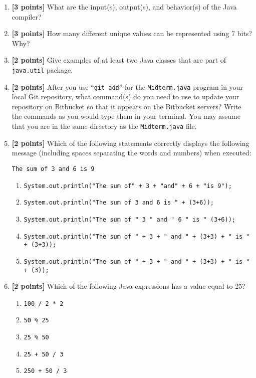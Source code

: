\documentclass[11pt]{report}
\begin{document}
\begin{enumerate}
\item {\bf [3 points]}
What are the input(s), output(s), and behavior(s) of the Java compiler?

\vspace{.75in}
\item {\bf [3 points]}
How many different unique values can be represented using 7 bits? Why?

\bigskip
\bigskip
\bigskip
\bigskip

\item {\bf [2 points]}
Give examples of at least two Java classes that are part of {\tt java.util} package.

\bigskip
\bigskip
\bigskip
\bigskip

\item {\bf [2 points]}
  After you use ``{\tt git add}'' for the {\tt Midterm.java} program in your local Git repository, what command(s) do
  you need to use to update your repository on Bitbucket so that it appears on the Bitbucket servers? Write the commands
  as you would type them in your terminal. You may assume that you are in the same directory as the {\tt Midterm.java}
  file.  

\newpage

\item {\bf [2 points]}
Which of the following statements correctly displays the following
message (including spaces separating the words and numbers) when executed:
\begin{center}
\verb$The sum of 3 and 6 is 9$
\end{center}
\begin{enumerate}
\item \verb$System.out.println("The sum of" + 3 + "and" + 6 + "is 9");$
\item \verb$System.out.println("The sum of 3 and 6 is " + (3+6));$
\item \verb$System.out.println("The sum of " 3 " and " 6 " is " (3+6));$
\item \verb$System.out.println("The sum of " + 3 + " and " + (3+3) + " is " + (3+3));$
\item \verb$System.out.println("The sum of " + 3 + " and " + (3+3) + " is " + (3));$
\end{enumerate}

\bigskip

\item {\bf [2 points]}
Which of the following Java expressions has a value equal to 25?
\begin{enumerate}
\item \verb$100 / 2 * 2$
\item \verb$50 % 25$
\item \verb$25 % 50$
\item \verb$25 + 50 / 3$
\item \verb$250 + 50 / 3$
\end{enumerate}


\end{enumerate}
\end{document}
